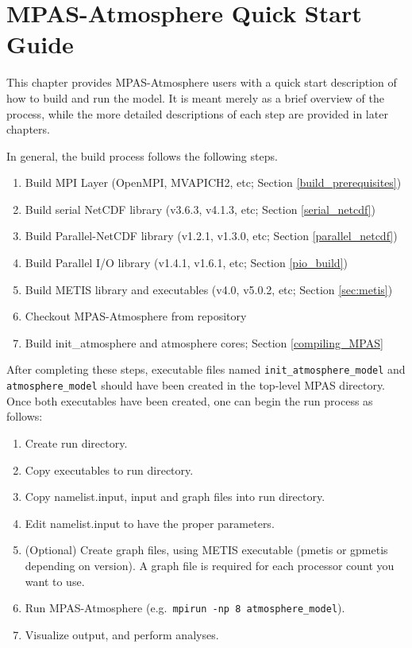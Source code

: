 \chapter{MPAS-Atmosphere Quick Start Guide}
\label{chap:quick_start}

This chapter provides MPAS-Atmosphere users with a quick start description of
how to build and run the model. It is meant merely as a brief overview of the
process, while the more detailed descriptions of each step are provided in later
chapters.

In general, the build process follows the following steps.

\begin{enumerate}
	\item Build MPI Layer (OpenMPI, MVAPICH2, etc; Section \ref{build_prerequisites})
	\item Build serial NetCDF library (v3.6.3, v4.1.3, etc; Section \ref{serial_netcdf})
	\item Build Parallel-NetCDF library (v1.2.1, v1.3.0, etc; Section \ref{parallel_netcdf})
	\item Build Parallel I/O library (v1.4.1, v1.6.1, etc; Section \ref{pio_build})
	\item Build METIS library and executables (v4.0, v5.0.2, etc; Section \ref{sec:metis})
	\item Checkout MPAS-Atmosphere from repository
	\item Build init\_atmosphere and atmosphere cores; Section \ref{compiling_MPAS}
\end{enumerate}

After completing these steps, executable files named {\tt init\_atmosphere\_model} and
{\tt atmosphere\_model} should have been created in the top-level MPAS directory. Once
both executables have been created, one can begin the run process as follows:

\begin{enumerate}
	\item Create run directory.
	\item Copy executables to run directory.
	\item Copy namelist.input, input and graph files into run directory. 
	\item Edit namelist.input to have the proper parameters.
	\item (Optional) Create graph files, using METIS executable (pmetis or gpmetis depending on version).  A graph file is required for each processor count you want to use.
	\item Run MPAS-Atmosphere (e.g.\ {\tt mpirun -np 8 atmosphere\_model}).
	\item Visualize output, and perform analyses.
\end{enumerate}
